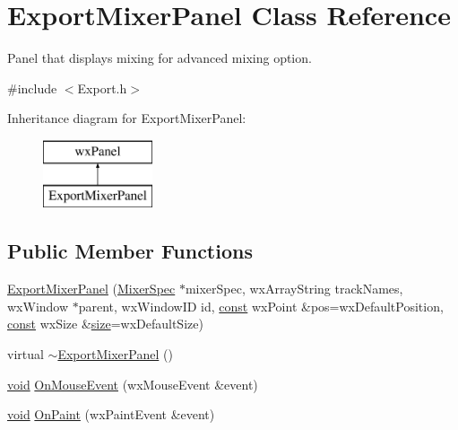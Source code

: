 \hypertarget{class_export_mixer_panel}{}\section{Export\+Mixer\+Panel Class Reference}
\label{class_export_mixer_panel}


Panel that displays mixing for advanced mixing option.  




{\ttfamily \#include $<$Export.\+h$>$}

Inheritance diagram for Export\+Mixer\+Panel\+:\begin{figure}[H]
\begin{center}
\leavevmode
\includegraphics[height=2.000000cm]{class_export_mixer_panel}
\end{center}
\end{figure}
\subsection*{Public Member Functions}
\begin{DoxyCompactItemize}
\item 
\hyperlink{class_export_mixer_panel_a139ac96e153608524aea4965120d24d9}{Export\+Mixer\+Panel} (\hyperlink{class_mixer_spec}{Mixer\+Spec} $\ast$mixer\+Spec, wx\+Array\+String track\+Names, wx\+Window $\ast$parent, wx\+Window\+ID id, \hyperlink{getopt1_8c_a2c212835823e3c54a8ab6d95c652660e}{const} wx\+Point \&pos=wx\+Default\+Position, \hyperlink{getopt1_8c_a2c212835823e3c54a8ab6d95c652660e}{const} wx\+Size \&\hyperlink{group__lavu__mem_ga854352f53b148adc24983a58a1866d66}{size}=wx\+Default\+Size)
\item 
virtual \hyperlink{class_export_mixer_panel_af9b838b3ac7ff0c62e6f4129e7577e87}{$\sim$\+Export\+Mixer\+Panel} ()
\item 
\hyperlink{sound_8c_ae35f5844602719cf66324f4de2a658b3}{void} \hyperlink{class_export_mixer_panel_a3ad0a17d93f600118b161e95fe8ceb31}{On\+Mouse\+Event} (wx\+Mouse\+Event \&event)
\item 
\hyperlink{sound_8c_ae35f5844602719cf66324f4de2a658b3}{void} \hyperlink{class_export_mixer_panel_aae4af1fae6bebbe7c4b544d25d65748d}{On\+Paint} (wx\+Paint\+Event \&event)
\end{DoxyCompactItemize}


